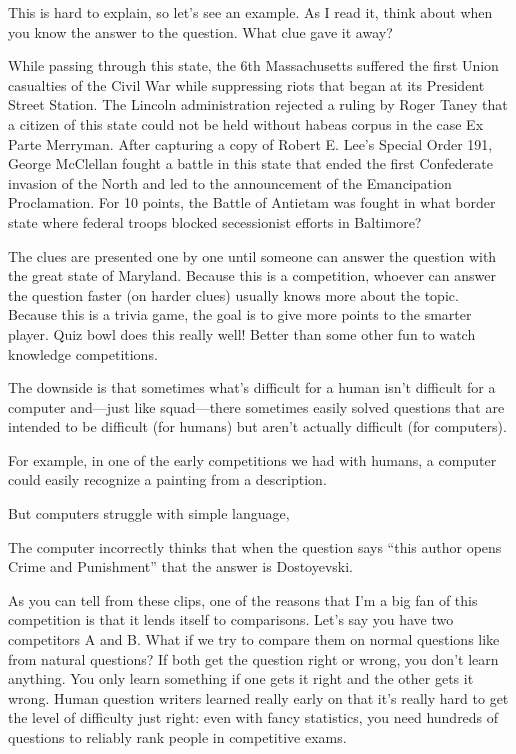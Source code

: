 This is hard to explain, so let’s see an example.  As I read it, think about when you know the answer to the question.  What clue gave it away?

While passing through this state, the 6th Massachusetts
suffered the first Union casualties of the Civil War while
suppressing riots that began at its President Street
Station. The Lincoln administration rejected a ruling by
Roger Taney that a citizen of this state could not
be held without habeas corpus in the case Ex Parte
Merryman. After capturing a copy of Robert E. Lee’s
Special Order 191, George McClellan fought a battle in
this state that ended the first Confederate invasion of
the North and led to the announcement of the
Emancipation Proclamation. For 10 points, the Battle of
Antietam was fought in what border state where federal
troops blocked secessionist efforts in Baltimore?



The clues are presented one by one until someone can answer the question with the great state of Maryland. Because this is a competition, whoever can answer the question faster (on harder clues) usually knows more about the topic.  Because this is a trivia game, the goal is to give more points to the smarter player.  Quiz bowl does this really well!  Better than some other fun to watch knowledge competitions.

The downside is that sometimes what's difficult for a human isn't difficult for a computer and—just like squad—there sometimes easily solved questions that are intended to be difficult (for humans) but aren't actually difficult (for computers).  

For example, in one of the early competitions we had with humans, a computer could easily recognize a painting from a description. 

But computers struggle with simple language, 

The computer incorrectly thinks that when the question says “this author opens Crime and Punishment” that the answer is Dostoyevski.

As you can tell from these clips, one of the reasons that I’m a big fan of this competition is that it lends itself to comparisons. Let’s say you have two competitors A and B. What if we try to compare them on normal questions like from natural questions? If both get the question right or wrong, you don’t learn anything. You only learn something if one gets it right and the other gets it wrong. Human question writers learned really early on that it’s really hard to get the level of difficulty just right: even with fancy statistics, you need hundreds of questions to reliably rank people in competitive exams.

